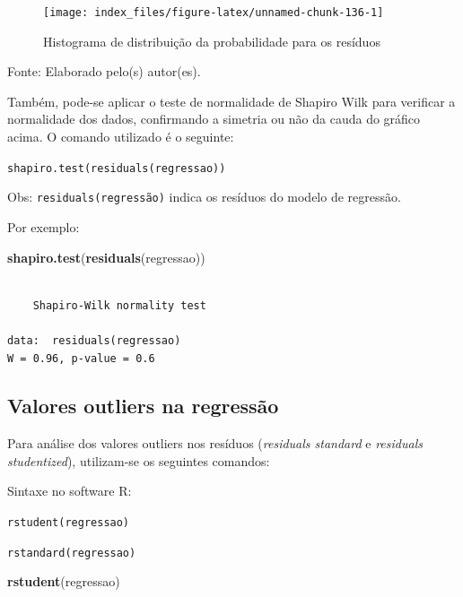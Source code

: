 \documentclass[12pt,portuguese,oneside]{book}
\newenvironment{Shaded}{\begin{snugshade}}{\end{snugshade}}
\newcommand{\KeywordTok}[1]{\textcolor[rgb]{0.13,0.29,0.53}{\textbf{#1}}}
\newcommand{\NormalTok}[1]{#1}
\begin{document}
\begin{figure}[H]

{\centering \texttt{[image: index\_files/figure-latex/unnamed-chunk-136-1]} 

}

\caption{Histograma de distribuição da probabilidade para os resíduos}\label{fig:unnamed-chunk-136}
\end{figure}

Fonte: Elaborado pelo(s) autor(es).

Também, pode-se aplicar o teste de normalidade de Shapiro Wilk para
verificar a normalidade dos dados, confirmando a simetria ou não da
cauda do gráfico acima. O comando utilizado é o seguinte:

\texttt{shapiro.test(residuals(regressao))}

Obs: \texttt{residuals(regressão)} indica os resíduos do modelo de
regressão.

Por exemplo:

\begin{Shaded}
\begin{Highlighting}[]
\KeywordTok{shapiro.test}\NormalTok{(}\KeywordTok{residuals}\NormalTok{(regressao))}
\end{Highlighting}
\end{Shaded}

\begin{verbatim}

    Shapiro-Wilk normality test

data:  residuals(regressao)
W = 0.96, p-value = 0.6
\end{verbatim}

\subsection{Valores outliers na
regressão}\label{valores-outliers-na-regressao}

Para análise dos valores outliers nos resíduos (\emph{residuals
standard} e \emph{residuals studentized}), utilizam-se os seguintes
comandos:

Sintaxe no software R:

\texttt{rstudent(regressao)}

\texttt{rstandard(regressao)}

\begin{Shaded}
\begin{Highlighting}[]
\KeywordTok{rstudent}\NormalTok{(regressao)}
\end{Highlighting}
\end{Shaded}
\end{document}
